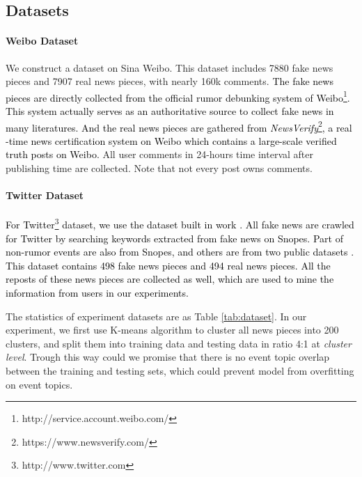 \documentclass[conference]{IEEEtran}
\newcommand{\kai}[1]{\textcolor{blue}{Kai: {#1}}}
\newcommand{\new}[1]{\textcolor{black}{{#1}}}
\begin{document}
	\subsection{Datasets}\label{sec:data}

	\paragraph{Weibo Dataset}We construct a dataset on Sina Weibo. This dataset includes 7880 fake news pieces and 7907 real news pieces, with nearly 160k comments. \new{The fake news pieces are directly collected from the official rumor debunking system of Weibo\footnote{http://service.account.weibo.com/}. This system actually serves as an authoritative source to collect fake news in many literatures\cite{ma2016detecting,jin2017multimodal}. And the real news pieces are gathered from {\em NewsVerify}\footnote{https://www.newsverify.com/}, a real -time news certification system on Weibo which contains a large-scale verified truth posts on Weibo\cite{zhou2015real}. }All user comments in 24-hours time interval after publishing time are collected. Note that not every post owns comments.
	
	\paragraph{Twitter Dataset}\new{For Twitter\footnote{http://www.twitter.com} dataset, we use the dataset built in work \cite{ma2016detecting}. All fake news  are crawled for Twitter by searching keywords extracted from fake news on Snopes. Part of non-rumor events are also from Snopes, and others are from two public datasets \cite{castillo2011information,kwon2013prominent}. This dataset contains 498 fake news pieces and 494 real news pieces. All the reposts of these news pieces are collected as well, which are used to mine the information from users in our experiments.}
	
	The statistics of experiment datasets are as Table \ref{tab:dataset}.  In our experiment, we first use K-means algorithm to cluster all news pieces into 200 clusters, and split them into training data and testing data in ratio 4:1 at {\em cluster level}. Trough this way could we promise that there is no event topic overlap between the training and testing sets, which could prevent model from overfitting on event topics.
	
\end{document}
